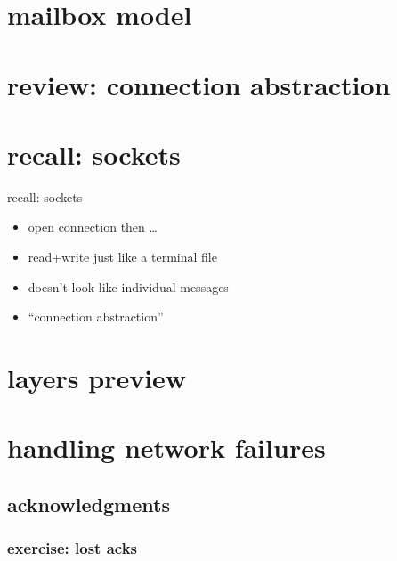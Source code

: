 


\section{mailbox model}


\section{review: connection abstraction}



\section{recall: sockets}

\begin{frame}{recall: sockets}
    \begin{itemize}
    \item open connection then \ldots \\
    \item read+write just like a terminal file
    \vspace{.5cm}
    \item doesn't look like individual messages
    \item ``connection abstraction''
    \end{itemize}
\end{frame}

\section{layers preview}


\section{handling network failures}


\subsection{acknowledgments}

\subsubsection{exercise: lost acks}

